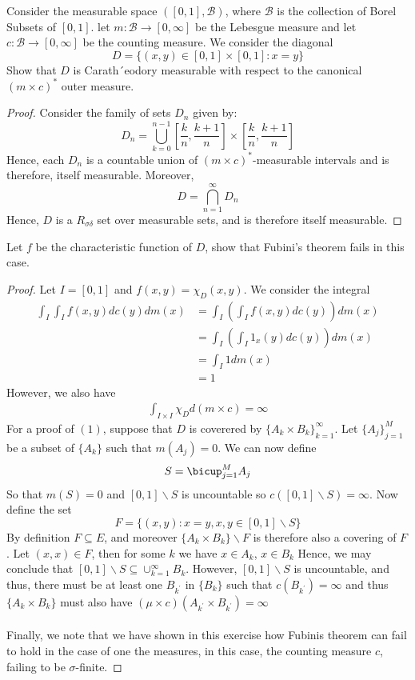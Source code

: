 \documentclass[nocolor]{report}
\begin{document}
\begin{ex}[Question 3a] Consider the measurable space $([0,1],\mathcal{B})$, where $\mathcal{B}$ is the collection of Borel Subsets of $[0,1]$. let $m:\mathcal{B}\rightarrow[0,\infty]$ be the Lebesgue measure and let $c:\mathcal{B}\rightarrow[0,\infty]$ be the counting measure. We consider the diagonal
$$D = \{(x,y)\in[0,1]\times[0,1]: x=y\}$$
Show that $D$ is  Carath´eodory measurable with respect to the canonical $(m\times c)^*$ outer measure.
\end{ex}
\begin{proof}
    Consider the family of sets $D_n$ given by: 
    $$D_n = \bigcup_{k=0}^{n-1}\left[ \frac{k}{n}, \frac{k+1}{n}\right]\times \left[ \frac{k}{n}, \frac{k+1}{n}\right] $$
    Hence, each $D_n$ is a countable union of $(m\times c)^*$-measurable intervals and is therefore, itself measurable. Moreover, 
    $$D = \bigcap_{n=1}^{\infty}D_n$$
    Hence, $D$ is a $R_{\sigma\delta}$ set over measurable sets, and is therefore itself measurable.
\end{proof}
\begin{ex}[Question 3b]
    Let $f$ be the characteristic function of $D$, show that Fubini's theorem fails in this case.
\end{ex}
\begin{proof}
    Let $I = [0,1]$ and $f(x,y) = \chi_D(x,y)$. We consider the integral
    \begin{align*}
        \int_I \int_I f(x,y) dc(y) dm(x) &=  \int_I\left( \int_I f(x,y) dc(y)\right) dm(x)\\
        &=  \int_I\left( \int_I 1_{x}(y)dc(y)\right) dm(x) \\
        &= \int_I 1 dm(x) \\
        &= 1
    \end{align*}
    However, we also have 
    \begin{align}
        \int_{I\times I} \chi_D d(m\times c) = \infty
    \end{align}
    For a proof of $(1)$, suppose that $D$ is coverered by $\{A_k \times B_k\}_{k=1}^{\infty}$. Let $\{A_j\}_{j=1}^{M}$ be a subset of $\{A_k\}$ such that $m(A_j) = 0$. We can now define 
    $$S = \bicup_{j=1}^{M}A_j$$
    So that $m(S) = 0$ and $[0,1]\backslash S$ is uncountable so $c([0,1]\backslash S) = \infty$. Now define the set 
    $$F = \{(x,y):  x=y, x,y\in[0,1]\backslash S\}$$
    By definition $F\subseteq E$, and moreover $\{A_k\times B_k\}\backslash F$ is therefore also a covering of $F$. Let $(x,x)\in F$, then for some $k$ we have $x\in A_k$, $x\in B_k$
    Hence, we may conclude that $[0,1]\backslash S \subseteq \cup_{k=1}^{\infty}B_k$. However, $[0,1]\backslash S$ is uncountable, and thus, there must be at least one $B_{k^\prime}$ in $\{B_k\}$ such that $c(B_{k^\prime}) = \infty$ and thus $\{A_k\times B_k\}$ must also have $(\mu\times c)(A_{k^\prime}\times B_{k^\prime}) = \infty$\\
    \\
    Finally, we note that we have shown in this exercise how Fubinis theorem can fail to hold in the case of one the measures, in this case, the counting measure $c$, failing to be $\sigma$-finite.
\end{proof}
\end{document}
